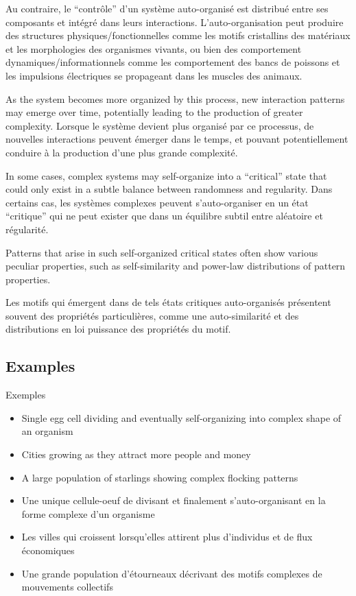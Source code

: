 \documentclass[12pt]{article}
\begin{document}
Au contraire, le ``contrôle'' d'un système auto-organisé est distribué entre ses composants et intégré dans leurs interactions. L'auto-organisation peut produire des structures physiques/fonctionnelles comme les motifs cristallins des matériaux et les morphologies des organismes vivants, ou bien des comportement dynamiques/informationnels comme les comportement des bancs de poissons et les impulsions électriques se propageant dans les muscles des animaux.

As the system becomes more organized by this process, new interaction patterns may emerge over time, potentially leading to the production of greater complexity.
Lorsque le système devient plus organisé par ce processus, de nouvelles interactions peuvent émerger dans le temps, et pouvant potentiellement conduire à la production d'une plus grande complexité.

In some cases, complex systems may self-organize into a ``critical'' state that could only exist in a subtle balance between randomness and regularity.
Dans certains cas, les systèmes complexes peuvent s'auto-organiser en un état ``critique'' qui ne peut exister que dans un équilibre subtil entre aléatoire et régularité.

Patterns that arise in such self-organized critical states often show various peculiar properties, such as self-similarity and power-law distributions of pattern properties.

Les motifs qui émergent dans de tels états critiques auto-organisés présentent souvent des propriétés particulières, comme une auto-similarité et des distributions en loi puissance des propriétés du motif.


\subsection*{Examples}{Exemples}

\begin{itemize}
	\item Single egg cell dividing and eventually self-organizing into complex shape of an organism
        \item Cities growing as they attract more people and money
        \item A large population of starlings showing complex flocking patterns
\end{itemize}

\begin{itemize}
	\item Une unique cellule-oeuf de divisant et finalement s'auto-organisant en la forme complexe d'un organisme
	\item Les villes qui croissent lorsqu'elles attirent plus d'individus et de flux économiques
	\item Une grande population d'étourneaux décrivant des motifs complexes de mouvements collectifs
\end{itemize}
\end{document}
